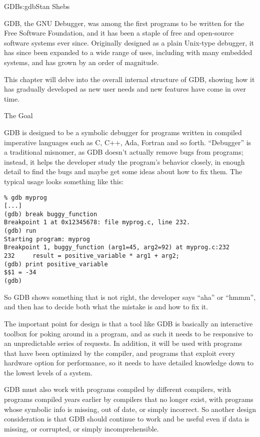 \begin{aosachapter}{GDB}{s:gdb}{Stan Shebs}

GDB, the GNU Debugger, was among the first programs to be written for
the Free Software Foundation, and it has been a staple of free and
open-source software systems ever since.  Originally designed as a
plain Unix-type debugger, it has since been expanded to a wide range
of uses, including with many embedded systems, and has grown by an
order of magnitude.

This chapter will delve into the overall internal structure of GDB,
showing how it has gradually developed as new user needs and new
features have come in over time.

\begin{aosasect1}{The Goal}

GDB is designed to be a symbolic debugger for programs written in
compiled imperative languages such as C, C++, Ada, Fortran and so
forth.  ``Debugger'' is a traditional misnomer, as GDB doesn't
actually remove bugs from programs; instead, it helps the developer
study the program's behavior closely, in enough detail to find the
bugs and maybe get some ideas about how to fix them.  The typical
usage looks something like this:

\begin{verbatim}
% gdb myprog
[...]
(gdb) break buggy_function
Breakpoint 1 at 0x12345678: file myprog.c, line 232.
(gdb) run
Starting program: myprog
Breakpoint 1, buggy_function (arg1=45, arg2=92) at myprog.c:232
232     result = positive_variable * arg1 + arg2;
(gdb) print positive_variable
$$1 = -34
(gdb)
\end{verbatim}

So GDB shows something that is not right, the developer says ``aha''
or ``hmmm'', and then has to decide both what the mistake is and how
to fix it.

The important point for design is that a tool like GDB is basically an
interactive toolbox for poking around in a program, and as such it
needs to be responsive to an unpredictable series of requests.  In
addition, it will be used with programs that have been optimized by
the compiler, and programs that exploit every hardware option for
performance, so it needs to have detailed knowledge down to the lowest
levels of a system.

GDB must also work with programs compiled by different compilers,
with programs compiled years earlier by compilers that no longer exist,
with programs whose symbolic info is missing, out of date, or simply
incorrect.  So another design consideration is that GDB should
continue to work and be useful even if data is missing, or corrupted,
or simply incomprehensible.


\end{aosasect1}
\end{aosachapter}
